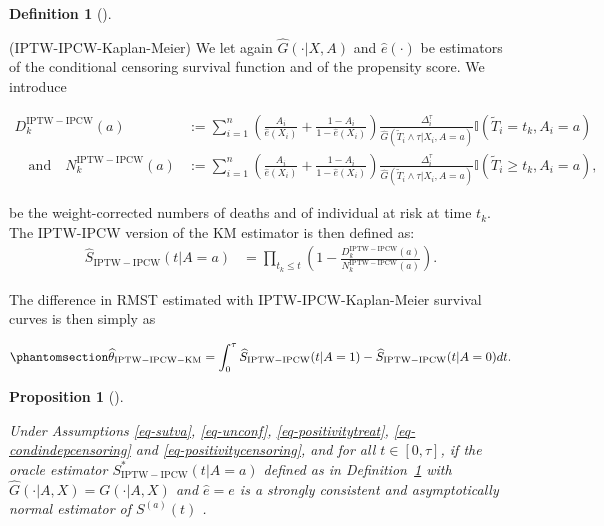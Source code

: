 \documentclass[
  11pt,
  a4paper,
]{article}
\theoremstyle{plain}
\theoremstyle{plain}
\theoremstyle{plain}
\newtheorem{proposition}{Proposition}[section]
\theoremstyle{definition}
\newtheorem{definition}{Definition}[section]
\theoremstyle{remark}
\begin{document}
\begin{definition}[]\protect\hypertarget{def-iptwipcwkm}{}\label{def-iptwipcwkm}

(IPTW-IPCW-Kaplan-Meier) We let again \(\widehat G(\cdot|X,A)\) and
\(\widehat e(\cdot)\) be estimators of the conditional censoring
survival function and of the propensity score. We introduce

\begin{align*}
D_k^{\mathrm{IPTW-IPCW}}(a) &:= \sum_{i=1}^n \left(\frac{A_i}{\widehat e(X_i)}+\frac{1-A_i}{1-\widehat e(X_i)} \right)\frac{\Delta_i^\tau}{\widehat G(\widetilde T_i \wedge\tau | X_i,A=a)} \mathbb{I}(\widetilde T_i = t_k, A_i=a) \\
\quad\text{and}\quad N^{\mathrm{IPTW-IPCW}}_k(a) &:= \sum_{i=1}^n \left(\frac{A_i}{\widehat e(X_i)}+\frac{1-A_i}{1-\widehat e(X_i)} \right)\frac{\Delta_i^\tau}{\widehat G(\widetilde T_i \wedge\tau | X_i,A=a)} \mathbb{I}(\widetilde T_i \geqslant t_k, A_i=a),
\end{align*}

be the weight-corrected numbers of deaths and of individual at risk at
time \(t_k\). The IPTW-IPCW version of the KM estimator is then defined
as: \[
\begin{aligned}
\widehat{S}_{\mathrm{IPTW-IPCW}}(t | A=a) &= \prod_{t_k \leqslant t}\left(1-\frac{D_k^{\mathrm{IPTW-IPCW}}(a)}{N_k^{\mathrm{IPTW-IPCW}}(a)}\right). 
\end{aligned}
\]

\end{definition}

The difference in RMST estimated with IPTW-IPCW-Kaplan-Meier survival
curves is then simply as

\begin{equation}\phantomsection\label{eq-RMST_IPTW_IPCWKM}{
\widehat{\theta}_{\mathrm{IPTW-IPCW-KM}} = \int_{0}^{\tau}\widehat{S}_{\mathrm{IPTW-IPCW}}(t|A=1)-\widehat{S}_{\mathrm{IPTW-IPCW}}(t|A=0)dt.
}\end{equation}

\begin{proposition}[]\protect\hypertarget{prp-iptwipcwkm}{}\label{prp-iptwipcwkm}

Under Assumptions
\ref{eq-sutva}, \ref{eq-unconf}, \ref{eq-positivitytreat}, \ref{eq-condindepcensoring}
and \ref{eq-positivitycensoring}, and for all \(t \in [0,\tau]\), if the
oracle estimator \(S^*_{\mathrm{IPTW-IPCW}}(t | A=a)\) defined as in
Definition~\ref{def-iptwipcwkm} with
\(\widehat G(\cdot|A,X) = G(\cdot|A,X)\) and \(\widehat e = e\) is a
strongly consistent and asymptotically normal estimator of
\(S^{(a)}(t)\) .

\end{proposition}
\end{document}
